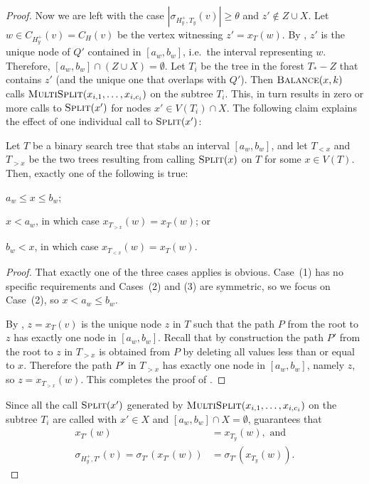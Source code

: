 \documentclass[kpfonts]{patmorin}
\let\le\leqslant
\let\geq\geqslant
\begin{document}
\begin{proof}
  Now we are left with the case $|\sigma_{H^+_{y},T_{y}}(v)| \geq \theta$ and $z'\not\in Z\cup X$. 
  Let $w \in C_{H^+_y}(v)=C_H(v)$ be the vertex witnessing $z' = x_{T}(w)$.
  By , 
  $z'$ is the unique node of $Q'$ contained in $[a_w,b_w]$, i.e.\ the interval representing $w$.  Therefore, $[a_w,b_w]\cap (Z\cup X)=\emptyset$.
  Let $T_i$ be the tree in the forest $T_*-Z$ that contains $z'$ (and the unique one that overlaps with $Q'$). 
  Then $\textsc{Balance}(x,k)$ calls $\textsc{MultiSplit}(x_{i,1},\ldots,x_{i,c_i})$ on the subtree $T_{i}$.  This, in turn results in zero or more calls to $\textsc{Split}(x')$ for nodes $x'\in V(T_{i})\cap X$. The following claim explains the effect of one individual call to $\textsc{Split}(x')$:

  \begin{clm}
    Let $T$ be a binary search tree that stabs an interval $[a_w,b_w]$, 
    and let $T_{<x}$ and $T_{>x}$ be the two trees resulting from calling $\textsc{Split}(x)$ on $T$ for some $x\in V(T)$. Then, exactly one of the following is true:
    \begin{compactenum}
      \item $a_w\le x\le b_w$;
      \item $x< a_w$, in which case $x_{T_{>x}}(w)=x_T(w)$; or
      \item $b_w < x$, in which case $x_{T_{<x}}(w)=x_T(w)$.
    \end{compactenum}
  \end{clm}
  \begin{proof}
    That exactly one of the three cases applies is obvious.  Case~(1) has no specific requirements and Cases~(2) and (3) are symmetric, so we focus on Case~(2), so $x < a_w\le b_w$.

    By , $z=x_T(v)$ is the unique node $z$ in $T$ such that the path $P$ from the root to $z$ has exactly one node in $[a_w,b_w]$. 
    Recall that by construction 
    the path $P'$ from the root to $z$ in $T_{>x}$ is obtained from $P$ 
    by deleting all values less than or equal to $x$. 
    Therefore the path $P'$ in $T_{>x}$ has exactly one node in $[a_w,b_w]$, namely $z$, 
    so $z=x_{T_{>x}}(w)$. This completes the proof of .
  \end{proof}

  Since all the call $\textsc{Split}(x')$ generated by $\textsc{MultiSplit}(x_{i,1},\ldots,x_{i,c_i})$ on the subtree $T_{i}$ are called with $x'\in X$ and $[a_w,b_w]\cap X =\emptyset$,  guarantees that 
  \begin{align*}
  x_{T'}(w) &= x_{T_y}(w), \textrm{ and}\\
  \sigma_{H^+_y,T'}(v) = \sigma_{T'}(x_{T'}(w)) &= \sigma_{T'}(x_{T_y}(w)).
  \end{align*}


\end{proof}
\end{document}
